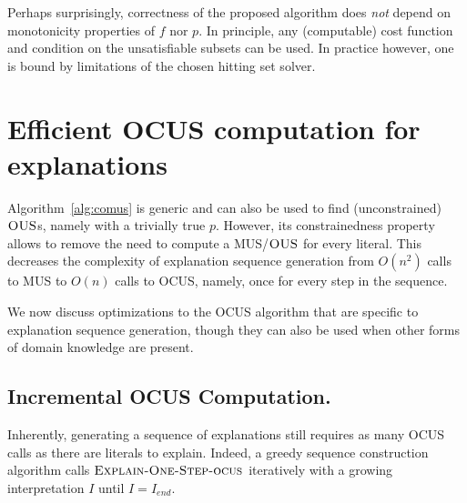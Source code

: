 \documentclass[twoside,11pt]{article}
\newcommand\m[1]{\mathcal{#1}}
\newtheorem{example}[ex]{Example}
\newcommand\Iend{\ensuremath{I_\mathit{end} }\xspace}
\newcommand\formulac{\ensuremath{\m{C} }\xspace}
\newcommand\mm[1]{\ensuremath{#1}\xspace}
\newcommand\call[1]{\mm{\textsc{#1}}}
\newcommand\omus{\mm{\call{OUS}}}
\newcommand\onestepo{\ensuremath{\call{Explain-One-Step-ocus}} \xspace}
\begin{document}
Perhaps surprisingly, correctness of the proposed algorithm does \emph{not} depend on monotonicity properties of $f$ nor $p$. In principle, any (computable) cost function and condition on the unsatisfiable subsets can be used. In practice however, one is bound by limitations of the chosen hitting set solver.






\section{Efficient OCUS computation for explanations}

Algorithm~\ref{alg:comus} is generic and can also be used to find (unconstrained) \omus{}s, namely with a trivially true $p$.
However, its constrainedness property allows to remove the need to compute a MUS/\omus for every literal. This decreases the complexity of explanation sequence generation from $O(n^2)$ calls to MUS to $O(n)$ calls to OCUS, namely, once for every step in the sequence. 

We now discuss optimizations to the OCUS algorithm that are specific to explanation sequence generation, though they can also be used when other forms of domain knowledge are present. 

\subsection{Incremental OCUS Computation.}
Inherently, generating a sequence of explanations still requires as many OCUS calls as there are literals to explain. 
Indeed, a greedy sequence construction algorithm %
calls \onestepo iteratively with a growing interpretation $I$ until $I=\Iend$.
\end{document}
